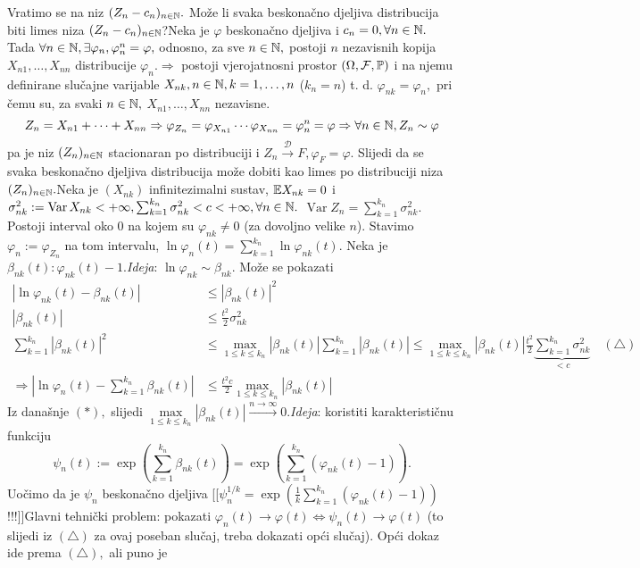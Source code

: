 \documentclass{article}
\newcommand{\Var}{\operatorname{Var}}
\begin{document}
Vratimo se na niz \((Z_n-c_n)_{n\in\Bbb N}.\) Može li svaka beskonačno djeljiva distribucija biti limes niza \((Z_n-c_n)_{n\in\Bbb N}\)?\newline Neka je \(\varphi\) beskonačno djeljiva i \(c_n=0,\forall n\in\Bbb N.\) Tada \(\forall n\in\Bbb N,\exists \varphi_n,\varphi_n^n=\varphi,\)  odnosno, za sve \(n\in\Bbb N,\) postoji \(n\) nezavisnih kopija \(X_{n1},\ldots,X_{nn}\) distribucije \(\varphi_n.\)\newline \(\Rightarrow\) postoji vjerojatnosni prostor \((\Omega,\mathcal F,\Bbb P)\) i na njemu definirane slučajne varijable \(X_{nk},n\in\Bbb N,k=1,\ldots,n\) (\(k_n=n\)) t. d. \(\varphi_{nk}=\varphi_n,\) pri čemu su, za svaki \(n\in\Bbb N,\) \(X_{n1},\ldots,X_{nn}\) nezavisne. \[Z_n=X_{n1}+\cdots+X_{nn}\Rightarrow\varphi_{Z_n}=\varphi_{X_{n1}}\cdots\varphi_{X_{nn}}=\varphi_n^n=\varphi\Rightarrow\forall n\in\Bbb N,Z_n\sim\varphi\] pa je niz \((Z_n)_{n\in\Bbb N}\) stacionaran po distribuciji i \(Z_n\overset{\mathcal D}{\longrightarrow}F,\varphi_F=\varphi.\) Slijedi da se svaka beskonačno djeljiva distribucija može dobiti kao limes po distribuciji niza \((Z_n)_{n\in\Bbb N}.\)\newline\newline Neka je \((X_{nk})\) infinitezimalni sustav, \(\Bbb EX_{nk}=0\) i \(\sigma_{nk}^2:=\Var X_{nk}<+\infty,\sum_{k=1}^{k_n}\sigma_{nk}^2<c<+\infty,\forall n\in\Bbb N.\) \(\Var Z_n=\sum_{k=1}^{k_n}\sigma_{nk}^2.\) Postoji interval oko \(0\) na kojem su \(\varphi_{nk}\ne0\) (za dovoljno velike \(n\)). Stavimo \(\varphi_n:=\varphi_{Z_n}\) na tom intervalu, \(\ln\varphi_n(t)=\sum_{k=1}^{k_n}\ln\varphi_{nk}(t).\) Neka je \(\beta_{nk}(t):\varphi_{nk}(t)-1.\)\newline\textit{Ideja}: \(\ln\varphi_{nk}\sim\beta_{nk}.\) Može se pokazati \[\begin{aligned}|\ln\varphi_{nk}(t)-\beta_{nk}(t)|&\le|\beta_{nk}(t)|^2\\|\beta_{nk}(t)|&\le\frac{t^2}2\sigma_{nk}^2\\\sum_{k=1}^{k_n}|\beta_{nk}(t)|^2&\le\max_{1\le k\le k_n}|\beta_{nk}(t)|\sum_{k=1}^{k_n}|\beta_{nk}(t)|\le\max_{1\le k\le k_n}|\beta_{nk}(t)|\frac{t^2}2\underbrace{\sum_{k=1}^{k_n}\sigma_{nk}^2}_{<c}\quad(\triangle)\\\Rightarrow\left|\ln\varphi_n(t)-\sum_{k=1}^{k_n}\beta_{nk}(t)\right|&\le\frac{t^2c}2\max_{1\le k\le k_n}|\beta_{nk}(t)|\end{aligned}\] Iz današnje \((\ast),\) slijedi \(\max\limits_{1\le k\le k_n}|\beta_{nk}(t)|\overset{n\to\infty}{\longrightarrow}0.\)\newline\textit{Ideja}: koristiti karakterističnu funkciju \[\psi_n(t):=\exp\left(\sum_{k=1}^{k_n}\beta_{nk}(t)\right)=\exp\left(\sum_{k=1}^{k_n}\left(\varphi_{nk}(t)-1\right)\right).\] Uočimo da je \(\psi_n\) beskonačno djeljiva [[\(\psi_n^{1/k}=\exp\left(\frac1k\sum_{k=1}^{k_n}(\varphi_{nk}(t)-1)\right)\)!!!]]\newline\newline Glavni tehnički problem: pokazati \(\varphi_n(t)\to\varphi(t)\Leftrightarrow\psi_n(t)\to\varphi(t)\) (to slijedi iz \((\triangle)\) za ovaj poseban slučaj, treba dokazati opći slučaj). Opći dokaz ide prema \((\triangle),\) ali puno je 
\end{document}

